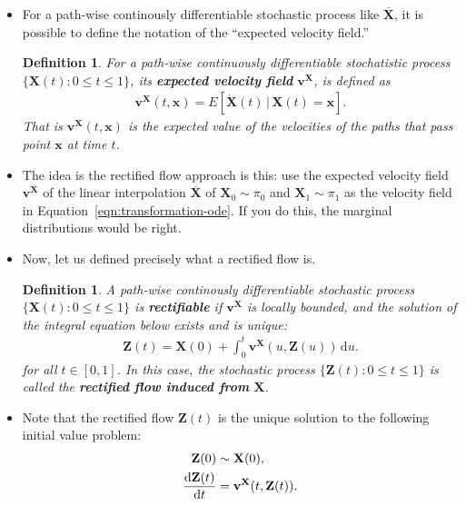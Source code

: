 \documentclass[10pt]{article}
\newtheorem{definition}[lemma]{Definition}
\newcommand{\dee}{\mathrm{d}}
\newcommand{\ve}[1]{\mathbf{#1}}
\begin{document}
\begin{itemize}
  \item For a path-wise continously differentiable stochastic process like $\overline{\ve{X}}$, it is possible to define the notation of the ``expected velocity field.''
  \begin{definition}
    For a path-wise continuously differentiable stochatistic process $\{ \ve{X}(t) : 0 \leq t \leq 1 \}$, its {\bf expected velocity field} $\ve{v}^{\ve{X}}$, is defined as
    \begin{align*}
      \ve{v}^{\ve{X}}(t, \ve{x}) = E[\dot{\ve{X}}(t)\, |\, \ve{X}(t) = \ve{x} ].
    \end{align*}
    That is $\ve{v}^{\ve{X}}(t, \ve{x})$ is the expected value of the velocities of the paths that pass point $\ve{x}$ at time $t$.
  \end{definition}

  \item The idea is the rectified flow approach is this: use the expected velocity field $\ve{v}^{\overline{\ve{X}}}$ of the linear interpolation $\overline{\ve{X}}$ of $\ve{X}_0 \sim \pi_0$ and $\ve{X}_1 \sim \pi_1$ as the velocity field in Equation~\eqref{eqn:transformation-ode}. If you do this, the marginal distributions would be right.
  
  \item Now, let us defined precisely what a rectified flow is.
  \begin{definition}
    A path-wise continously differentiable stochastic process $\{ \ve{X}(t): 0 \leq t \leq 1 \}$ is {\bf rectifiable} if $\ve{v}^{\ve{X}}$ is locally bounded, and the solution of the integral equation below exists and is unique:
    \begin{align*}
      \ve{Z}(t) = \ve{X}(0) + \int_0^t \ve{v}^{\ve{X}}(u,\ve{Z}(u))\, \dee u.
    \end{align*}
    for all $t \in [0,1]$. In this case, the stochastic process $\{ \ve{Z}(t): 0 \leq t \leq 1 \}$ is called the {\bf rectified flow induced from} $\ve{X}$.
  \end{definition}

  \item Note that the rectified flow $\ve{Z}(t)$ is the unique solution to the following initial value problem:
  \begin{align}
    \ve{Z}(0) &\sim \ve{X}(0), \notag \\
    \frac{\dee \ve{Z}(t)}{\dee t} &= \ve{v}^{\ve{X}}(t,\ve{Z}(t)). \label{eqn:recified-flow-ode}
  \end{align}


\end{itemize}
\end{document}
